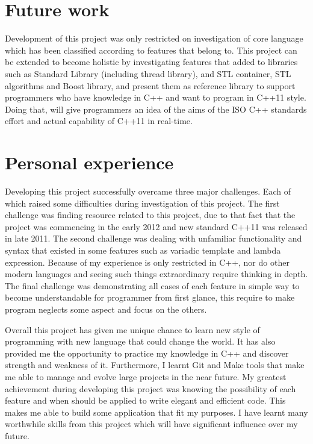 \documentclass[11pt]{report}
\begin{document}
\section{Future work}
\label{sec: future work}
Development of this project was only restricted on investigation of core language which has been classified according to features that belong to. This project can be extended to become holistic by investigating features that added to libraries such as Standard Library (including thread library), and STL container, STL algorithms and Boost library, and present them as reference library to support programmers who have knowledge in C++ and want to program in C++11 style. Doing that, will give programmers an idea of the aims of the ISO C++ standards effort and actual capability of C++11 in real-time.

\section{Personal experience}
\label{sec: personal experience}
Developing this project successfully overcame three major challenges.  Each of which raised some difficulties during investigation of this project. The first challenge was finding resource related to this project, due to that fact that the project was commencing in the early  2012 and new standard C++11 was released in late  2011. The second challenge was dealing with unfamiliar functionality and syntax that existed in some features such as variadic template and lambda expression. Because of my experience is only restricted in C++, nor do other modern languages and seeing such things extraordinary require thinking in depth. The final challenge was demonstrating all cases of each feature in simple way to become understandable for programmer from first glance, this require to make program neglects some aspect and focus on the others.

Overall this project has given me unique chance to learn new style of programming with new language that could change the world. It has also provided me the opportunity to practice my knowledge in C++ and discover strength and weakness of it. Furthermore, I learnt Git and Make tools that make me able to manage and evolve large projects in the near future. My greatest achievement during developing this project was knowing the possibility of each feature and when should be applied to write elegant and efficient code. This makes me able to build some application that fit my purposes. I have learnt many worthwhile skills from this project which will have significant influence over my future.
\end{document}
